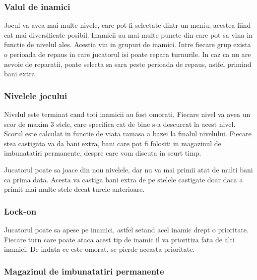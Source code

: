 \documentclass[12pt, a4paper]{article}
\begin{document}
	
	
	
	
	\subsubsection{Valul de inamici}
	
	Jocul va avea mai multe nivele, care pot fi selectate dintr-un meniu, acestea fiind cat mai diversificate posibil. Inamicii au mai multe puncte din care pot sa vina in functie de nivelul ales. Acestia vin in grupuri de inamici. Intre fiecare grup exista o perioada de repaus in care jucatorul isi poate repara turnurile. In caz ca nu are nevoie de reparatii, poate selecta sa sara peste perioada de repaus, astfel primind bani extra.
	
	
	
	
	
	\subsubsection{Nivelele jocului}
	
	Nivelul este terminat cand toti inamicii au fost omorati. Fiecare nivel va avea un scor de maxim 3 stele, care specifica cat de bine s-a descurcat la acest nivel. Scorul este calculat in functie de viata ramasa a bazei la finalul nivelului. Fiecare stea castigata va da bani extra, bani care pot fi folositi in magazinul de imbunatatiri permanente, despre care vom discuta in scurt timp.
	\newline
	
	Jucatorul poate sa joace din nou nivelele, dar nu va mai primii atat de multi bani ca prima data. Acesta va castiga bani extra de pe stelele castigate doar daca a primit mai multe stele decat turele anterioare.
	
	
	
	
	
	\subsubsection{Lock-on}
	
	Jucatorul poate sa apese pe inamici, astfel setand acel inamic drept o prioritate. Fiecare turn care poate ataca acest tip de inamic il va prioritiza fata de alti inamici. De indata ce este omorat, se pierde aceasta prioritate.
	
	
	
	
	
	\subsubsection{Magazinul de imbunatatiri permanente}
	
\end{document}
